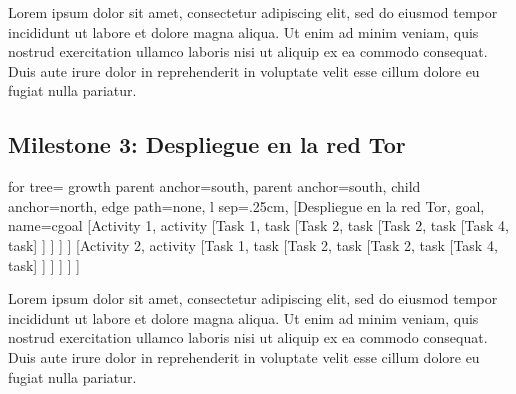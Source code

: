 Lorem ipsum dolor sit amet, consectetur adipiscing elit, sed do eiusmod tempor incididunt ut labore et dolore magna aliqua. Ut enim ad minim veniam, quis nostrud exercitation ullamco laboris nisi ut aliquip ex ea commodo consequat. Duis aute irure dolor in reprehenderit in voluptate velit esse cillum dolore eu fugiat nulla pariatur.

\subsection{Milestone 3: Despliegue en la red Tor}
\begin{adjustbox}{margin=2.5ex 5ex 2.5ex 2.5ex,center}
	\begin{forest} for tree={
			growth parent anchor=south,
			parent anchor=south,
			child anchor=north,
			edge path={none}, 
			l sep=.25cm,
	}   
	[Despliegue en la red Tor, goal, name=cgoal
		[Activity 1, activity
		[Task 1, task
		[Task 2, task
		[Task 2, task
		[Task 4, task] ] ] ] ]
		[Activity 2, activity
		[Task 1, task
		[Task 2, task
		[Task 2, task
		[Task 4, task] ] ] ] ] ] 
	\end{forest}
\end{adjustbox}

Lorem ipsum dolor sit amet, consectetur adipiscing elit, sed do eiusmod tempor incididunt ut labore et dolore magna aliqua. Ut enim ad minim veniam, quis nostrud exercitation ullamco laboris nisi ut aliquip ex ea commodo consequat. Duis aute irure dolor in reprehenderit in voluptate velit esse cillum dolore eu fugiat nulla pariatur.